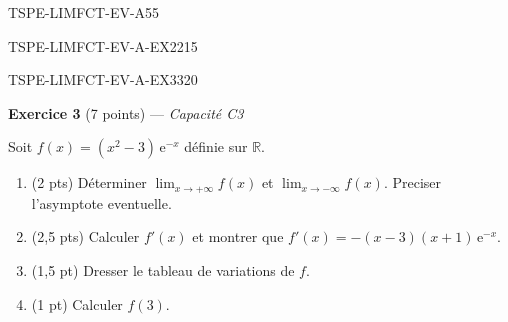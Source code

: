 \begin{evaluation}{TSPE-LIMFCT-EV-A}{55}
\begin{exercice}{TSPE-LIMFCT-EV-A-EX2}{2}{15}
\end{exercice}


\begin{exercice}{TSPE-LIMFCT-EV-A-EX3}{3}{20}

\textbf{Exercice 3} (7 points) — \textit{Capacité C3}

\medskip

Soit $f(x) = (x^2 - 3)\,\mathrm{e}^{-x}$ définie sur $\mathbb{R}$.

\begin{enumerate}
  \item (2 pts) Déterminer $\lim_{x \to +\infty} f(x)$ et $\lim_{x \to -\infty} f(x)$. Preciser l'asymptote eventuelle.
  \item (2,5 pts) Calculer $f'(x)$ et montrer que $f'(x) = -(x-3)(x+1)\,\mathrm{e}^{-x}$.
  \item (1,5 pt) Dresser le tableau de variations de $f$.
  \item (1 pt) Calculer $f(3)$.
\end{enumerate}

\end{exercice}

\end{evaluation}
